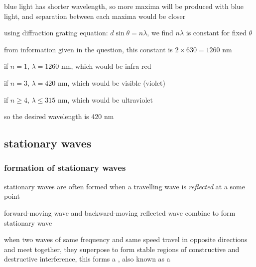 blue light has shorter wavelength, so more maxima will be produced with blue light, and separation between each maxima would be closer \eoe


\sol using diffraction grating equation: $d \sin\theta = n\lambda$, we find $n\lambda$ is constant for fixed $\theta$

from information given in the question, this constant is $ 2\times630 = 1260 \text{ nm}$

if $n=1$, $\lambda = 1260 \text{ nm}$, which would be infra-red

if $n=3$, $\lambda = 420 \text{ nm}$, which would be visible (violet)

if $n\geq 4$, $\lambda \leq 315 \text{ nm}$, which would be ultraviolet

so the desired wavelength is 420 nm \eoe







\subsection{stationary waves}

\subsubsection{formation of stationary waves}

stationary waves are often formed when a travelling wave is \emph{reflected} at a some point

forward-moving wave and backward-moving reflected wave combine to form stationary wave

\begin{ilight}
	when two waves of same frequency and same speed travel in opposite directions and meet together, they superpose to form stable regions of constructive and destructive interference, this forms a , also known as a 
\end{ilight}

